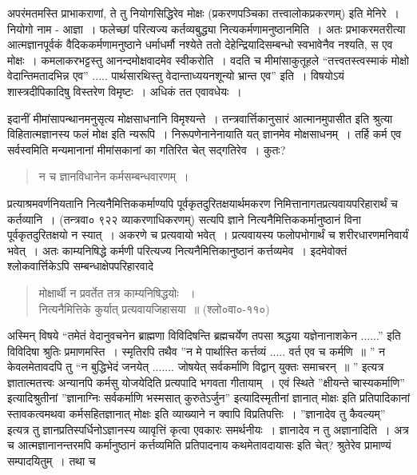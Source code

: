 {अपरंमतमस्ति प्राभाकराणां, ते तु नियोगसिद्धिरेव मोक्षः (प्रकरणपञ्चिका तत्त्वालोकप्रकरणम्) इति मेनिरे~। नियोगो नाम - आज्ञा~। फलेच्छां परित्यज्य कर्तव्यबुद्ध्या नित्यकर्मणामनुष्ठानमिति~। अतः प्रभाकरमतरीत्या आत्मज्ञानपूर्वकं वैदिककर्मणामनुष्ठाने धर्माधर्मौ नश्येते ततो देहेन्द्रियादिसम्बन्धो स्वभावेनैव नश्यति, स एव मोक्षः~। कमलाकरभट्टस्तु आनन्दमोक्षवादमेव स्वीकरोति~। वदति च मीमांसाकुतूहले “तत्त्वतस्त्वस्माकं मोक्षो वेदान्तिमतादभिन्न एव” ..... पार्थसारथिस्तु वेदान्ताध्ययनशून्यो भ्रान्त एव” इति~। विषयोऽयं शास्त्रदीपिकादिषु विस्तरेण विमृष्टः~। अधिकं तत एवावधेयः~। 

इदानीं मीमांसापन्थानमनुसृत्य मोक्षसाधनानि विमृश्यन्ते~। तन्त्रवार्त्तिकानुसारं आत्मानमुपासीत इति श्रुत्या विहितात्मज्ञानस्य फलं मोक्ष इति न्यरूपि~। निरूपणेनानेनायाति यत् ज्ञानमेव मोक्षसाधनम्~। तर्हि कर्म एव सर्वस्वमिति मन्यमानानां मीमांसकानां का गतिरित चेत्  सद्गतिरेव~। कुतः?
\begin{verse}
न च ज्ञानविधानेन कर्मसम्बन्धवारणम्~। 
\end{verse}

प्रत्याश्रमवर्णनियतानि नित्यनैमित्तिककर्माण्यपि पूर्वकृतदुरितक्षयार्थमकरण निमित्तानागतप्रत्यवायपरिहारार्थं च कर्तव्यानि~। (तन्त्रवा० ९२२ व्याकरणाधिकरणम्) सत्यपि ज्ञाने नित्यनैमित्तिककर्मानुष्ठानं विना पूर्वकृतदुरितक्षयो न स्यात्~। अकरणे च प्रत्यवायो भवेत्~। प्रत्यवायस्य फलोपभोगार्थं च शरीरधारणमनिवार्यं भवेत्~। अतः काम्यनिषिद्धे कर्मणी परित्यज्य नित्यनैमित्तिकानुष्ठानं कर्त्तव्यमेव~। इदमेवोक्तं श्लोकवार्त्तिकेऽपि सम्बन्धाक्षेपपरिहारवादे

\begin{verse}
मोक्षार्थी न प्रवर्तेत तत्र काम्यनिषिद्धयोः ~। \\
नित्यनैमित्तिके कुर्यात् प्रत्यवायजिहासया~॥ (श्लो०वा०-११०)
\end{verse}

अस्मिन् विषये “तमेतं वेदानुवचनेन ब्राह्मणा विविदिषन्ति ब्रह्मचर्येण तपसा श्रद्धया यज्ञेनानाशकेन ......” इति विविदिषा श्रुतिः प्रमाणमस्ति~। स्मृतिरपि तथैव ”न मे पार्थास्ति कर्त्तव्यं ..... वर्त एव च कर्मणि~॥ ” न केवलमेतावदपि तु “न बुद्धिभेदं जनयेत् ....... जोषयेत् सर्वकर्माणि विद्वान् युक्तः समाचरन्~॥ ” इत्यत्र ज्ञातात्मतत्त्वः अन्यानपि कर्मसु योजयेदिति प्रत्यपादि भगवता गीतायाम्~। एवं स्थिते ”क्षीयन्ते चास्यकर्माणि” इत्यादिश्रुतीनां ”ज्ञानाग्निः सर्वकर्माणि भस्मसात् कुरुतेऽर्जुन” इत्यादिस्मृतीनां ज्ञानात् मोक्षः इति प्रतिपादिकानां स्तावकत्वमथवा कर्मसहितज्ञानात् मोक्षः इति व्याख्याने न क्वापि विप्रतिपत्तिः~। ”ज्ञानादेव तु कैवल्यम्” इत्यत्र तु ज्ञानप्रतिस्पर्धिनोऽज्ञानस्य व्यावृत्तिं कृत्वा एवकारः समर्थनीयः~। ज्ञानादेव न तु अज्ञानादिति~। अत्र च आत्मज्ञानानन्तरमपि कर्मानुष्ठानं कर्त्तव्यमिति प्रतिपादनाय कथमेतावदायासः इति चेत्? श्रुतेरेव प्रामाण्यं सम्पादयितुम्~। तथा च 

}
